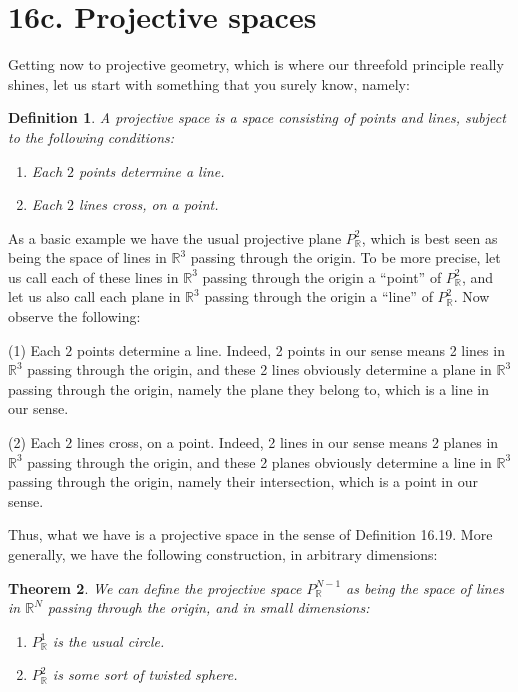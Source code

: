 \documentclass[12pt]{amsbook}
\newtheorem{theorem}{Theorem}[chapter]
\newtheorem{definition}[theorem]{Definition}
\begin{document}
\section*{16c. Projective spaces}

Getting now to projective geometry, which is where our threefold principle really shines, let us start with something that you surely know, namely:

\begin{definition}
A projective space is a space consisting of points and lines, subject to the following conditions:
\begin{enumerate}
\item Each $2$ points determine a line.

\item Each $2$ lines cross, on a point.
\end{enumerate}
\end{definition}

As a basic example we have the usual projective plane $P^2_\mathbb R$, which is best seen as being the space of lines in $\mathbb R^3$ passing through the origin. To be more precise, let us call each of these lines in $\mathbb R^3$ passing through the origin a ``point'' of $P^2_\mathbb R$, and let us also call each plane in $\mathbb R^3$ passing through the origin a ``line'' of $P^2_\mathbb R$. Now observe the following:

\bigskip

(1) Each $2$ points determine a line. Indeed, 2 points in our sense means 2 lines in $\mathbb R^3$ passing through the origin, and these 2 lines obviously determine a plane in $\mathbb R^3$ passing through the origin, namely the plane they belong to, which is a line in our sense.

\bigskip

(2) Each $2$ lines cross, on a point. Indeed, 2 lines in our sense means 2 planes in $\mathbb R^3$ passing through the origin, and these 2 planes obviously determine a line in $\mathbb R^3$ passing through the origin, namely their intersection, which is a point in our sense.

\bigskip

Thus, what we have is a projective space in the sense of Definition 16.19. More generally, we have the following construction, in arbitrary dimensions:

\begin{theorem}
We can define the projective space $P^{N-1}_\mathbb R$ as being the space of lines in $\mathbb R^N$ passing through the origin, and in small dimensions:
\begin{enumerate}
\item $P^1_\mathbb R$ is the usual circle.

\item $P^2_\mathbb R$ is some sort of twisted sphere.
\end{enumerate}
\end{theorem}
\end{document}
